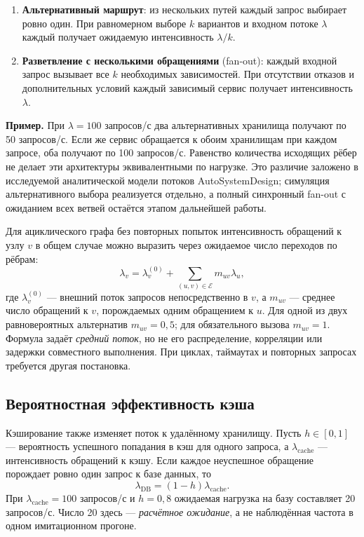 \begin{enumerate}
    \item \textbf{Альтернативный маршрут}: из нескольких путей каждый запрос выбирает ровно один. При равномерном выборе $k$ вариантов и входном потоке $\lambda$ каждый получает ожидаемую интенсивность $\lambda/k$.
    \item \textbf{Разветвление с несколькими обращениями} (fan-out): каждый входной запрос вызывает все $k$ необходимых зависимостей. При отсутствии отказов и дополнительных условий каждый зависимый сервис получает интенсивность $\lambda$.
\end{enumerate}

\textbf{Пример.} При $\lambda=100$ запросов/с два альтернативных хранилища получают по 50 запросов/с. Если же сервис обращается к обоим хранилищам при каждом запросе, оба получают по 100 запросов/с. Равенство количества исходящих рёбер не делает эти архитектуры эквивалентными по нагрузке. Это различие заложено в исследуемой аналитической модели потоков AutoSystemDesign; симуляция альтернативного выбора реализуется отдельно, а полный синхронный fan-out с ожиданием всех ветвей остаётся этапом дальнейшей работы.

Для ациклического графа без повторных попыток интенсивность обращений к узлу $v$ в общем случае можно выразить через ожидаемое число переходов по рёбрам:
\begin{equation}
\lambda_v=\lambda_v^{(0)}+
\sum_{(u,v)\in\mathcal{E}} m_{uv}\lambda_u,
\label{eq:arrival-flow}
\end{equation}
где $\lambda_v^{(0)}$ --- внешний поток запросов непосредственно в $v$, а $m_{uv}$ --- среднее число обращений к $v$, порождаемых одним обращением к $u$. Для одной из двух равновероятных альтернатив $m_{uv}=0{,}5$; для обязательного вызова $m_{uv}=1$. Формула задаёт \emph{средний поток}, но не его распределение, корреляции или задержки совместного выполнения. При циклах, таймаутах и повторных запросах требуется другая постановка.

\subsection{Вероятностная эффективность кэша}

Кэширование также изменяет поток к удалённому хранилищу. Пусть $h\in[0,1]$ --- вероятность успешного попадания в кэш для одного запроса, а $\lambda_{\mathrm{cache}}$ --- интенсивность обращений к кэшу. Если каждое неуспешное обращение порождает ровно один запрос к базе данных, то
\begin{equation}
\lambda_{\mathrm{DB}}=(1-h)\lambda_{\mathrm{cache}}.
\end{equation}
При $\lambda_{\mathrm{cache}}=100$ запросов/с и $h=0{,}8$ ожидаемая нагрузка на базу составляет 20 запросов/с. Число 20 здесь --- \emph{расчётное ожидание}, а не наблюдённая частота в одном имитационном прогоне.

